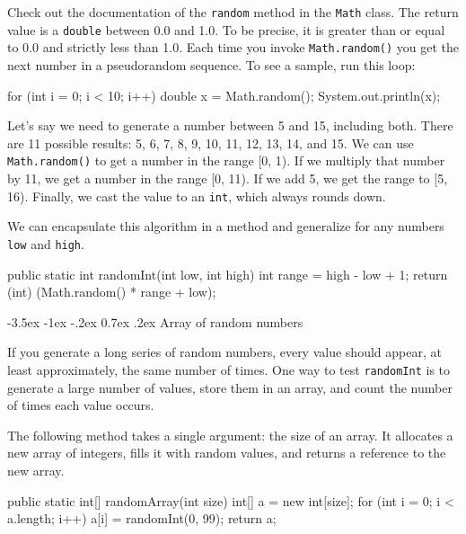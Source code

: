 \documentclass[12pt]{book}
\makeatletter
\theoremstyle{exercise}
\newcommand{\java}[1]{\verb"#1"}
\renewcommand{\section}{\@startsection{section}{1}{\z@}%
    {-3.5ex \@plus -1ex \@minus -.2ex}%
    {0.7ex \@plus.2ex}%
    {\normalfont\Large\bfseries}}
\newcommand{\java}[1]{\lstinline{#1}} %
\makeatother
\begin{document}

Check out the documentation of the \java{random} method in the \java{Math} class.
The return value is a \java{double} between 0.0 and 1.0.
To be precise, it is greater than or equal to 0.0 and strictly less than 1.0.
Each time you invoke \java{Math.random()} you get the next number in a pseudorandom sequence.
To see a sample, run this loop:

\begin{code}
    for (int i = 0; i < 10; i++) {
        double x = Math.random();
        System.out.println(x);
    }
\end{code}

Let's say we need to generate a number between 5 and 15, including both.
There are 11 possible results: 5, 6, 7, 8, 9, 10, 11, 12, 13, 14, and 15.
We can use \java{Math.random()} to get a number in the range [0, 1).
If we multiply that number by 11, we get a number in the range [0, 11).
If we add 5, we get the range to [5, 16).
Finally, we cast the value to an \java{int}, which always rounds down.

We can encapsulate this algorithm in a method and generalize for any numbers \java{low} and \java{high}.

\begin{code}
    public static int randomInt(int low, int high) {
        int range = high - low + 1;
        return (int) (Math.random() * range + low);
    }
\end{code}


\section{Array of random numbers}
\label{randarray}

If you generate a long series of random numbers, every value should appear, at least approximately, the same number of times.
One way to test \java{randomInt} is to generate a large number of values, store them in an array, and count the number of times each value occurs.

The following method takes a single argument: the size of an array.
It allocates a new array of integers, fills it with random values, and returns a reference to the new array.

\begin{code}
    public static int[] randomArray(int size) {
        int[] a = new int[size];
        for (int i = 0; i < a.length; i++) {
            a[i] = randomInt(0, 99);
        }
        return a;
    }
\end{code}
\end{document}
